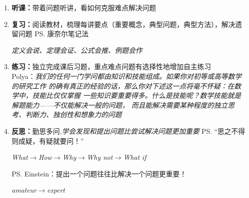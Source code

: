 \begin{itemize}
\begin{enumerate}
	  \item {\bf 听课：}带着问题听讲，看如何克服难点解决问题
	  \item {\bf 复习：}阅读教材，梳理每讲要点（重要概念，典型问题，典型方法），解决遗留问题
	  \ps{康奈尔笔记法}\\
	  \centerline{\it 定义会说、定理会证、公式会推、例题会作}
	  \item {\bf 练习：}独立完成课后习题，重点难点问题有选择性地增加自主练习\\
	  Polya：{\it 我们的任何一门学问都由知识和技能组成。如果你对初等或高等数学的研究工作
	  的确有真正的经验的话，那么你对下述这一点将毫不怀疑：在数学中，技能比仅仅掌握
	  一些知识要重要得多。什么是技能呢？数学技能就是解题能力——不仅能解决一般的问题，
	  而且能解决需要某种程度的独立思考、判断力、独创性和想象力的问题}
	  \item {\bf 反思：}勤思多问,{\it 学会发现和提出问题比尝试解决问题更加重要}
	  \ps{“思之不得则成疑，有疑就要问！”}\\
	  \centerline{\it What$\to$How$\to$Why$\to$Why not$\to$What if}
	  
	  \ps{Einstein：提出一个问题往往比解决一个问题更重要！}
	  \centerline{\it amateur$\to$expert}
	\end{enumerate}
\end{itemize}

